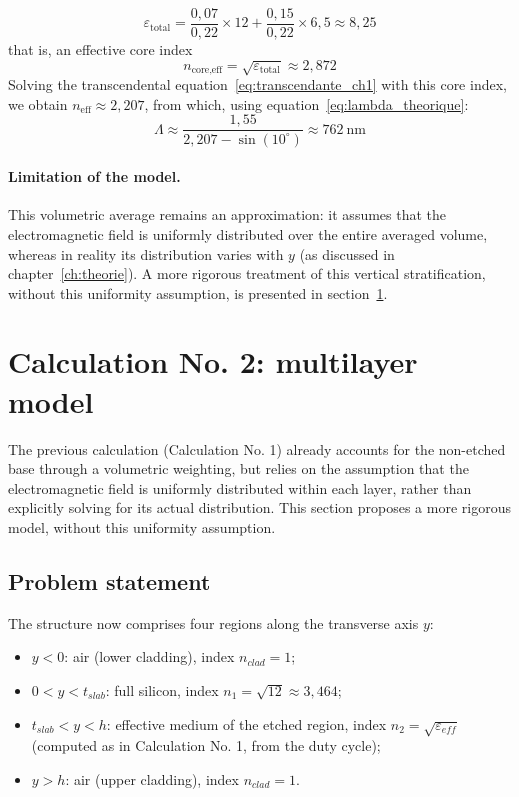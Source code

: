 \documentclass[a4paper,11pt]{report}
\begin{document}
\begin{equation}
\varepsilon_{\text{total}} = \frac{0{,}07}{0{,}22}\times12 + \frac{0{,}15}{0{,}22}\times6{,}5 \approx 8{,}25
\end{equation}
that is, an effective core index
\begin{equation}
n_{\text{core,eff}} = \sqrt{\varepsilon_{\text{total}}} \approx 2{,}872
\end{equation}
Solving the transcendental equation~\eqref{eq:transcendante_ch1} with this core index, we obtain $n_{\text{eff}}\approx2{,}207$, from which, using equation~\eqref{eq:lambda_theorique}:
\begin{equation}
\Lambda \approx \frac{1{,}55}{2{,}207-\sin(10^\circ)} \approx 762~\text{nm}
\end{equation}

\paragraph{Limitation of the model.} This volumetric average remains an approximation: it assumes that the electromagnetic field is uniformly distributed over the entire averaged volume, whereas in reality its distribution varies with $y$ (as discussed in chapter~\ref{ch:theorie}). A more rigorous treatment of this vertical stratification, without this uniformity assumption, is presented in section~\ref{sec:calcul2}. 

\section{Calculation No. 2: multilayer model}
\label{sec:calcul2}

The previous calculation (Calculation No. 1) already accounts for the non-etched base through a volumetric weighting, but relies on the assumption that the electromagnetic field is uniformly distributed within each layer, rather than explicitly solving for its actual distribution. This section proposes a more rigorous model, without this uniformity assumption.

\subsection*{Problem statement}

The structure now comprises four regions along the transverse axis $y$:
\begin{itemize}
    \item $y<0$: air (lower cladding), index $n_{clad}=1$;
    \item $0<y<t_{slab}$: full silicon, index $n_1=\sqrt{12}\approx3{,}464$;
    \item $t_{slab}<y<h$: effective medium of the etched region, index $n_2=\sqrt{\varepsilon_{eff}}$ (computed as in Calculation No. 1, from the duty cycle);
    \item $y>h$: air (upper cladding), index $n_{clad}=1$.
\end{itemize}
\end{document}
